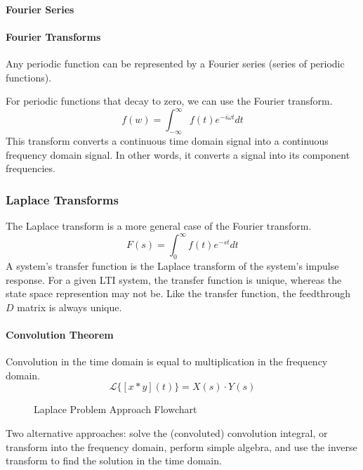 \documentclass[../notes.tex]{subfiles}
\begin{document}
\paragraph{Fourier Series}


\paragraph{Fourier Transforms}
Any periodic function can be represented by a Fourier series (series of periodic functions).

For periodic functions that decay to zero, we can use the Fourier transform.
\begin{equation}
    f(w) = \int_{-\infty}^{\infty}f(t)e^{-i\omega t}dt
\end{equation}
This transform converts a continuous time domain signal into a continuous frequency domain signal. In other words, it converts a signal into its component frequencies.

\subsubsection{Laplace Transforms}
The Laplace transform is a more general case of the Fourier transform.
\begin{equation}
    F(s) = \int_{0}^{\infty}f(t)e^{-st}dt
\end{equation}
A system's transfer function is the Laplace transform of the system's impulse response. For a given LTI system, the transfer function is unique, whereas the state space represention may not be. Like the transfer function, the feedthrough $D$ matrix is always unique.

\paragraph{Convolution Theorem}
Convolution in the time domain is equal to multiplication in the frequency domain.
\begin{equation}
    \mathcal{L}\{[x * y](t)\} = X(s) \cdot Y(s)
\end{equation}

\begin{figure}[H]
    \centering
    \caption{Laplace Problem Approach Flowchart}
\end{figure}
Two alternative approaches: solve the (convoluted) convolution integral, or transform into the frequency domain, perform simple algebra, and use the inverse transform to find the solution in the time domain.
\end{document}
